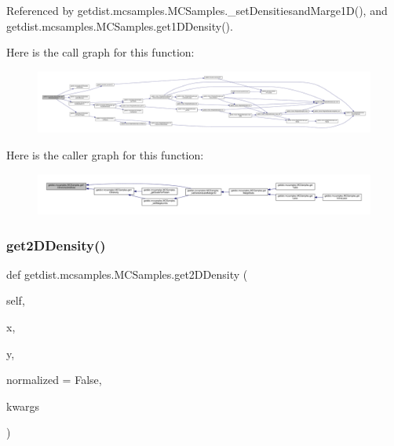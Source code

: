 Referenced by getdist.\+mcsamples.\+M\+C\+Samples.\+\_\+set\+Densitiesand\+Marge1\+D(), and getdist.\+mcsamples.\+M\+C\+Samples.\+get1\+D\+Density().

Here is the call graph for this function\+:
\nopagebreak
\begin{figure}[H]
\begin{center}
\leavevmode
\includegraphics[width=350pt]{classgetdist_1_1mcsamples_1_1MCSamples_a53dc1a5889467700091389070326f0c9_cgraph}
\end{center}
\end{figure}
Here is the caller graph for this function\+:
\nopagebreak
\begin{figure}[H]
\begin{center}
\leavevmode
\includegraphics[width=350pt]{classgetdist_1_1mcsamples_1_1MCSamples_a53dc1a5889467700091389070326f0c9_icgraph}
\end{center}
\end{figure}
\mbox{\label{classgetdist_1_1mcsamples_1_1MCSamples_a0987c9312d821d6916322667f208ebcf}} 
\subsubsection{\texorpdfstring{get2\+D\+Density()}{get2DDensity()}}
{\footnotesize\ttfamily def getdist.\+mcsamples.\+M\+C\+Samples.\+get2\+D\+Density (\begin{DoxyParamCaption}\item[{}]{self,  }\item[{}]{x,  }\item[{}]{y,  }\item[{}]{normalized = {\ttfamily False},  }\item[{}]{kwargs }\end{DoxyParamCaption})}

